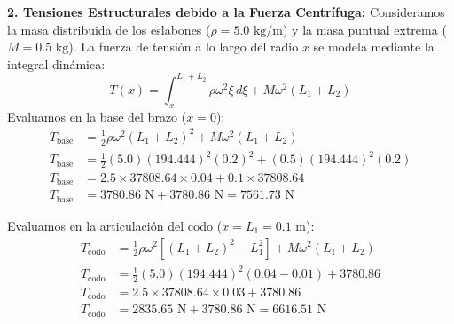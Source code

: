 \documentclass[11pt,a4paper]{article}
\begin{document}
\textbf{2. Tensiones Estructurales debido a la Fuerza Centrífuga:}
Consideramos la masa distribuida de los eslabones ($\rho = 5.0\text{ kg/m}$) y la masa puntual extrema ($M = 0.5\text{ kg}$). La fuerza de tensión a lo largo del radio $x$ se modela mediante la integral dinámica:
\begin{equation}
    T(x) = \int_{x}^{L_1+L_2} \rho \omega^2 \xi \, d\xi + M \omega^2 (L_1+L_2)
\end{equation}
Evaluamos en la base del brazo ($x = 0$):
\begin{align*}
    T_{\text{base}} &= \frac{1}{2}\rho\omega^2(L_1+L_2)^2 + M\omega^2(L_1+L_2) \\
    T_{\text{base}} &= \frac{1}{2}(5.0)(194.444)^2(0.2)^2 + (0.5)(194.444)^2(0.2) \\
    T_{\text{base}} &= 2.5 \times 37808.64 \times 0.04 + 0.1 \times 37808.64 \\
    T_{\text{base}} &= 3780.86\text{ N} + 3780.86\text{ N} = 7561.73\text{ N}
\end{align*}

Evaluamos en la articulación del codo ($x = L_1 = 0.1\text{ m}$):
\begin{align*}
    T_{\text{codo}} &= \frac{1}{2}\rho\omega^2\left[(L_1+L_2)^2 - L_1^2\right] + M\omega^2(L_1+L_2) \\
    T_{\text{codo}} &= \frac{1}{2}(5.0)(194.444)^2(0.04 - 0.01) + 3780.86 \\
    T_{\text{codo}} &= 2.5 \times 37808.64 \times 0.03 + 3780.86 \\
    T_{\text{codo}} &= 2835.65\text{ N} + 3780.86\text{ N} = 6616.51\text{ N}
\end{align*}
\end{document}
